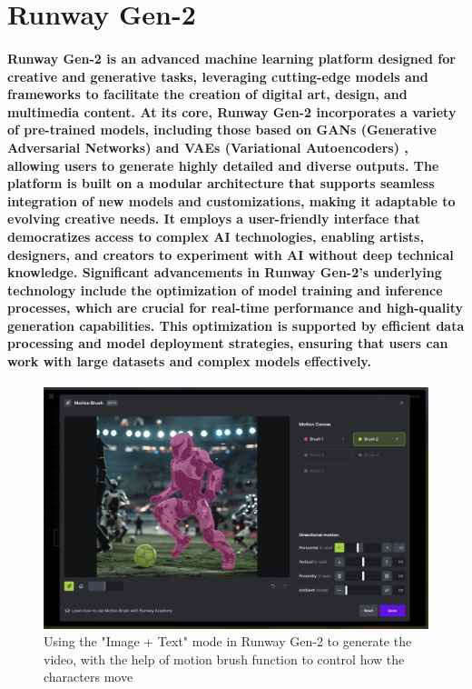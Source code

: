 \documentclass[11pt,a4paper,oneside]{report}
\begin{document}
\section{Runway Gen-2}
\paragraph{Runway Gen-2 is an advanced machine learning platform designed for creative and generative tasks, leveraging cutting-edge models and frameworks to facilitate the creation of digital art, design, and multimedia content. At its core, Runway Gen-2 incorporates a variety of pre-trained models, including those based on GANs (Generative Adversarial Networks) and VAEs (Variational Autoencoders) \cite{kingma2013auto}, allowing users to generate highly detailed and diverse outputs. The platform is built on a modular architecture that supports seamless integration of new models and customizations, making it adaptable to evolving creative needs. It employs a user-friendly interface that democratizes access to complex AI technologies, enabling artists, designers, and creators to experiment with AI without deep technical knowledge. Significant advancements in Runway Gen-2's underlying technology include the optimization of model training and inference processes, which are crucial for real-time performance and high-quality generation capabilities. This optimization is supported by efficient data processing and model deployment strategies, ensuring that users can work with large datasets and complex models effectively.}

\begin{figure}[htbp]
  \centering
  \includegraphics[width=\textwidth]{Runway.png}
  \caption{Using the "Image + Text" mode in Runway Gen-2 to generate the video, with the help of motion brush function to control how the characters move}
\end{figure}
\end{document}
